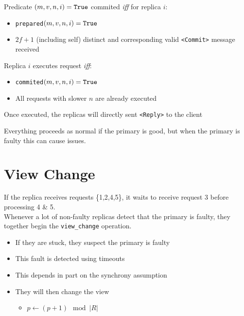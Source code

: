 \documentclass{easyclass}
\begin{document}
\begin{lem}[Commited]{}
    Predicate $(m,v,n,i) = \text{\texttt{True}}$ commited \emph{iff} for replica $i$:
    \begin{itemize}
        \item \texttt{prepared}$(m,v,n,i) = \text{\texttt{True}}$
        \item $2f+1$ (including self) distinct and corresponding valid \texttt{<Commit>} message received
    \end{itemize}
\end{lem}

\begin{theo}{}
    Replica $i$ executes request \emph{iff}:
    \begin{itemize}
        \item \texttt{commited}$(m,v,n,i) = \text{\texttt{True}}$
        \item All requests with slower $n$ are already executed
    \end{itemize}
    Once executed, the replicas will directly sent \texttt{<Reply>} to the client
\end{theo}

Everything proceeds as normal if the primary is good, but when
the primary is faulty this can cause issues.
\section{View Change}
\begin{lem}{}
    If the replica receives requests \{1,2,4,5\}, it waits to receive
    request 3 before processing 4 \& 5. \\
    Whenever a lot of non-faulty replicas detect that the primary is faulty,
    they together begin the \texttt{view\_change} operation.
    \begin{itemize}
        \item If they are stuck, they suspect the primary is faulty
        \item This fault is detected using timeouts
        \item This depends in part on the synchrony assumption
        \item They will then change the view
        \begin{itemize}
            \item $p \leftarrow (p+1) \mod \vert R \vert$
        \end{itemize}
    \end{itemize}
\end{lem}
\end{document}
